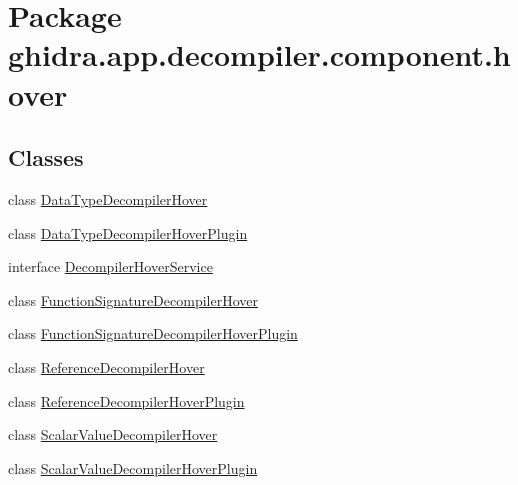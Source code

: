 \hypertarget{namespaceghidra_1_1app_1_1decompiler_1_1component_1_1hover}{}\section{Package ghidra.\+app.\+decompiler.\+component.\+hover}
\label{namespaceghidra_1_1app_1_1decompiler_1_1component_1_1hover}
\subsection*{Classes}
\begin{DoxyCompactItemize}
\item 
class \mbox{\hyperlink{classghidra_1_1app_1_1decompiler_1_1component_1_1hover_1_1_data_type_decompiler_hover}{Data\+Type\+Decompiler\+Hover}}
\item 
class \mbox{\hyperlink{classghidra_1_1app_1_1decompiler_1_1component_1_1hover_1_1_data_type_decompiler_hover_plugin}{Data\+Type\+Decompiler\+Hover\+Plugin}}
\item 
interface \mbox{\hyperlink{interfaceghidra_1_1app_1_1decompiler_1_1component_1_1hover_1_1_decompiler_hover_service}{Decompiler\+Hover\+Service}}
\item 
class \mbox{\hyperlink{classghidra_1_1app_1_1decompiler_1_1component_1_1hover_1_1_function_signature_decompiler_hover}{Function\+Signature\+Decompiler\+Hover}}
\item 
class \mbox{\hyperlink{classghidra_1_1app_1_1decompiler_1_1component_1_1hover_1_1_function_signature_decompiler_hover_plugin}{Function\+Signature\+Decompiler\+Hover\+Plugin}}
\item 
class \mbox{\hyperlink{classghidra_1_1app_1_1decompiler_1_1component_1_1hover_1_1_reference_decompiler_hover}{Reference\+Decompiler\+Hover}}
\item 
class \mbox{\hyperlink{classghidra_1_1app_1_1decompiler_1_1component_1_1hover_1_1_reference_decompiler_hover_plugin}{Reference\+Decompiler\+Hover\+Plugin}}
\item 
class \mbox{\hyperlink{classghidra_1_1app_1_1decompiler_1_1component_1_1hover_1_1_scalar_value_decompiler_hover}{Scalar\+Value\+Decompiler\+Hover}}
\item 
class \mbox{\hyperlink{classghidra_1_1app_1_1decompiler_1_1component_1_1hover_1_1_scalar_value_decompiler_hover_plugin}{Scalar\+Value\+Decompiler\+Hover\+Plugin}}
\end{DoxyCompactItemize}
